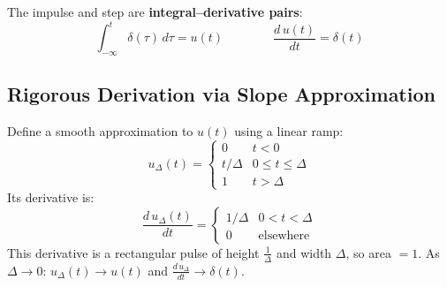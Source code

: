 \documentclass[10pt,a4paper]{article}
\begin{document}
\begin{defbox}
The impulse and step are \textbf{integral--derivative pairs}:
\[
  \boxed{\int_{-\infty}^{t}\delta(\tau)\,d\tau = u(t)}
  \qquad\qquad
  \boxed{\frac{d\,u(t)}{dt} = \delta(t)}
\]
\end{defbox}

\subsection*{Rigorous Derivation via Slope Approximation}

\begin{derivbox}
Define a smooth approximation to $u(t)$ using a linear ramp:
\[
  u_\Delta(t) = \begin{cases} 0 & t < 0 \\ t/\Delta & 0 \leq t \leq \Delta \\ 1 & t > \Delta \end{cases}
\]
Its derivative is:
\[
  \frac{d\,u_\Delta(t)}{dt} = \begin{cases} 1/\Delta & 0 < t < \Delta \\ 0 & \text{elsewhere} \end{cases}
\]
This derivative is a rectangular pulse of height $\tfrac{1}{\Delta}$ and width $\Delta$, so area $= 1$.
As $\Delta\to0$: $u_\Delta(t)\to u(t)$ and $\tfrac{d\,u_\Delta}{dt}\to\delta(t)$.


\end{derivbox}
\end{document}
